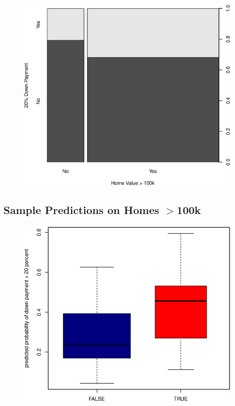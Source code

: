 \documentclass[11pt, fleqn]{article}
\begin{document}
\begin{figure}[!htb]
  \centering
  \includegraphics[scale=.5]{home_value_vs_20_down.eps}
  \caption{}
  \label{fig:value_20dwn}
\end{figure}

\subsection{Sample Predictions on Homes $>$100k}

\begin{figure}[!htb]
  \centering
  \includegraphics[scale=.5]{oos_subsample_100k.eps}
  \caption{}
  \label{fig:oos_sample_gt100k}
\end{figure}
\end{document}

